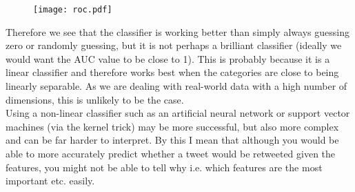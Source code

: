 \documentclass[paper=a4, fontsize=11pt]{scrartcl} %
\numberwithin{equation}{section} %
\numberwithin{figure}{section} %
\numberwithin{table}{section} %
\begin{document}
\begin{figure}[!h]
\centering
\texttt{[image: roc.pdf]}%
\end{figure}

Therefore we see that the classifier is working better than simply always guessing zero or randomly guessing, but it is not perhaps a brilliant classifier (ideally we would want the AUC value to be close to 1). This is probably because it is a linear classifier and therefore works best when the categories are close to being linearly separable. As we are dealing with real-world data with a high number of dimensions, this is unlikely to be the case.\\

Using a non-linear classifier such as an artificial neural network or support vector machines (via the kernel trick) may be more successful, but also more complex and can be far harder to interpret. By this I mean that although you would be able to more accurately predict whether a tweet would be retweeted given the features, you might not be able to tell why i.e. which features are the most important etc. easily.
\end{document}
